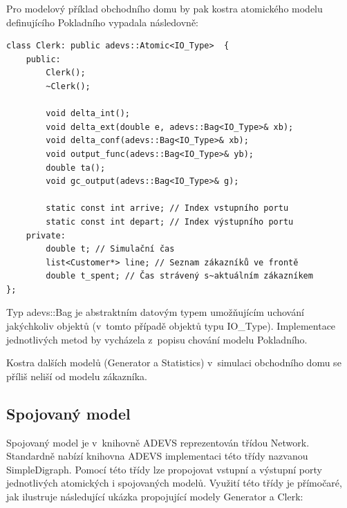 Pro modelový příklad obchodního domu by pak kostra atomického modelu definujícího Pokladního vypadala následovně:

\begin{lstlisting}
class Clerk: public adevs::Atomic<IO_Type>  {
    public:
        Clerk();
        ~Clerk();

        void delta_int();
        void delta_ext(double e, adevs::Bag<IO_Type>& xb);
        void delta_conf(adevs::Bag<IO_Type>& xb);
        void output_func(adevs::Bag<IO_Type>& yb);
        double ta();
        void gc_output(adevs::Bag<IO_Type>& g);
        
        static const int arrive; // Index vstupního portu
        static const int depart; // Index výstupního portu
    private:
        double t; // Simulační čas
        list<Customer*> line; // Seznam zákazníků ve frontě
        double t_spent; // Čas strávený s~aktuálním zákazníkem
};
\end{lstlisting}

Typ adevs::Bag je abstraktním datovým typem umožňujícím uchování jakýchkoliv objektů (v~tomto případě objektů typu IO\_Type). Implementace jednotlivých metod by vycházela z~popisu chování modelu Pokladního.

Kostra dalších modelů (Generator a Statistics) v~simulaci obchodního domu se příliš neliší od modelu zákazníka.

\subsection{Spojovaný model}

Spojovaný model je v~knihovně ADEVS reprezentován třídou Network. Standardně nabízí knihovna ADEVS implementaci této třídy nazvanou SimpleDigraph. Pomocí této třídy lze propojovat vstupní a výstupní porty jednotlivých atomických i spojovaných modelů. Využití této třídy je přímočaré, jak ilustruje následující ukázka propojující modely Generator a Clerk:

